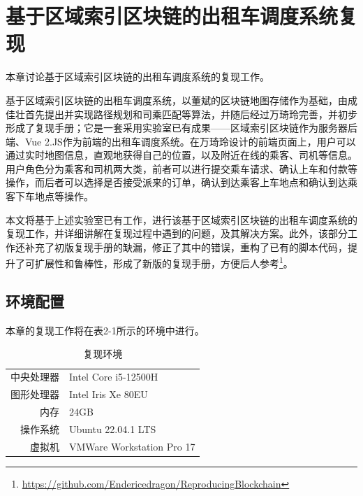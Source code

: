 %
%
%
%
%

\chapter{基于区域索引区块链的出租车调度系统复现}

本章讨论基于区域索引区块链的出租车调度系统的复现工作。

基于区域索引区块链的出租车调度系统，以董斌的区块链地图存储作为基础，由成佳壮首先提出并实现路径规划和司乘匹配等算法，并随后经过万琦玲完善，并初步形成了复现手册；它是一套采用实验室已有成果——区域索引区块链作为服务器后端、Vue 2.JS作为前端的出租车调度系统。在万琦玲设计的前端页面上，用户可以通过实时地图信息，直观地获得自己的位置，以及附近在线的乘客、司机等信息。用户角色分为乘客和司机两大类，前者可以进行提交乘车请求、确认上车和付款等操作，而后者可以选择是否接受派来的订单，确认到达乘客上车地点和确认到达乘客下车地点等操作。

本文将基于上述实验室已有工作，进行该基于区域索引区块链的出租车调度系统的复现工作，并详细讲解在复现过程中遇到的问题，及其解决方案。此外，该部分工作还补充了初版复现手册的缺漏，修正了其中的错误，重构了已有的脚本代码，提升了可扩展性和鲁棒性，形成了新版的复现手册，方便后人参考\footnote{\url{https://github.com/Endericedragon/ReproducingBlockchain}}。

\section{环境配置}

本章的复现工作将在表2-1所示的环境中进行。

\begin{table}[htbp]
    \linespread{1.5}
    \centering
    \caption{复现环境}\label{复现环境}
    \begin{tabular}{r|l} \toprule
        中央处理器 & Intel Core i5-12500H      \\
        图形处理器 & Intel Iris Xe 80EU        \\
        内存    & 24GB                      \\
        操作系统  & Ubuntu 22.04.1 LTS        \\
        虚拟机   & VMWare Workstation Pro 17 \\
        \bottomrule
    \end{tabular}
\end{table}

